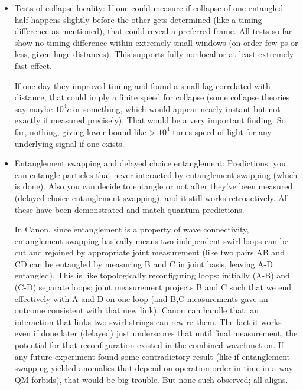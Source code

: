 \documentclass[11pt]{article}
\begin{document}
\begin{itemize}

\item 
Tests of collapse locality: If one could measure if collapse of one entangled half happens slightly before the other gets determined (like a timing difference as mentioned), that could reveal a preferred frame. All tests so far show no timing difference within extremely small windows (on order few ps or less, given huge distances). This supports fully nonlocal or at least extremely fast effect.

If one day they improved timing and found a small lag correlated with distance, that could imply a finite speed for collapse (some collapse theories say maybe $10^4 c$ or something, which would appear nearly instant but not exactly if measured precisely). That would be a very important finding. So far, nothing, giving lower bound like > $10^4$ times speed of light for any underlying signal if one exists.




\item 
Entanglement swapping and delayed choice entanglement: Predictions: you can entangle particles that never interacted by entanglement swapping (which is done). Also you can decide to entangle or not after they’ve been measured (delayed choice entanglement swapping), and it still works retroactively. All these have been demonstrated and match quantum predictions.

In Canon, since entanglement is a property of wave connectivity, entanglement swapping basically means two independent swirl loops can be cut and rejoined by appropriate joint measurement (like two pairs AB and CD can be entangled by measuring B and C in joint basis, leaving A-D entangled). This is like topologically reconfiguring loops: initially (A-B) and (C-D) separate loops; joint measurement projects B and C such that we end effectively with A and D on one loop (and B,C measurements gave an outcome consistent with that new link). Canon can handle that: an interaction that links two swirl strings can rewire them. The fact it works even if done later (delayed) just underscores that until final measurement, the potential for that reconfiguration existed in the combined wavefunction. If any future experiment found some contradictory result (like if entanglement swapping yielded anomalies that depend on operation order in time in a way QM forbids), that would be big trouble. But none such observed; all aligns.





\end{itemize}
\end{document}
